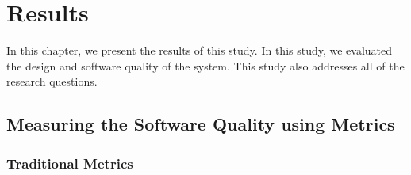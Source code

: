 
\chapter{Results}
In this chapter, we present the results of this study. 
In this study, we evaluated the design and software quality of the system. This study also addresses all of the research questions. 







\section{Measuring the Software Quality using Metrics}

\subsection{Traditional Metrics}
\label{sub:QA_metrics_results}



